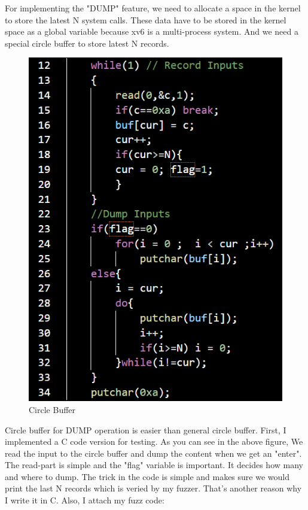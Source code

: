 \documentclass[11pt,oneside,a4paper]{article}
\begin{document}
For implementing the "DUMP" feature, we need to allocate a space in the kernel to store
the latest N system calls. These data have to be stored in the kernel space as a global 
variable because xv6 is a multi-process system. And we need a special circle buffer to
store latest N records.

\begin{figure}[H]
    \includegraphics[width=4.75in]{1-9.png}
    \centering
    \caption{Circle Buffer}
\end{figure}

Circle buffer for DUMP operation is easier than general circle buffer. First, I 
implemented a C code version for testing. As you can see in the above figure, 
We read the input to the circle buffer and dump the content when we get an "enter".
The read-part is simple and the "flag" variable is important. It decides how many
and where to dump. The trick in the code is simple and makes sure we would print the
last N records which is veried by my fuzzer. That's another reason why I write it 
in C. Also, I attach my fuzz code:
\end{document}
